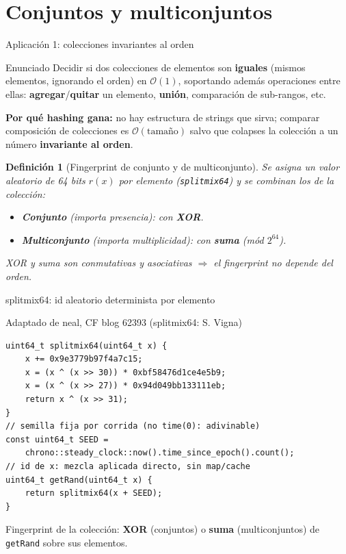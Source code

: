 \documentclass{beamer}
\newtheorem{definicion}{Definición}
\begin{document}
\section{Conjuntos y multiconjuntos}

\begin{frame}{Aplicación 1: colecciones invariantes al orden}
\begin{block}{Enunciado}
Decidir si dos colecciones de elementos son \textbf{iguales} (mismos elementos, ignorando el orden) en $\mathcal{O}(1)$, soportando además operaciones entre ellas: \textbf{agregar}/\textbf{quitar} un elemento, \textbf{unión}, comparación de sub-rangos, etc.
\end{block}
\pause
\textbf{Por qué hashing gana:} no hay estructura de strings que sirva; comparar composición de colecciones es $\mathcal{O}(\text{tamaño})$ salvo que colapses la colección a un número \textbf{invariante al orden}.
\pause
\begin{definicion}[Fingerprint de conjunto y de multiconjunto]
Se asigna un valor aleatorio de 64 bits $r(x)$ por elemento (\texttt{splitmix64}) y se combinan los de la colección:
\begin{itemize}
    \item \textbf{Conjunto} (importa presencia): con \textbf{XOR}.
    \item \textbf{Multiconjunto} (importa multiplicidad): con \textbf{suma} (mód $2^{64}$).
\end{itemize}
XOR y suma son conmutativas y asociativas $\Rightarrow$ el fingerprint no depende del orden.
\end{definicion}
\end{frame}

\begin{frame}[fragile]{splitmix64: id aleatorio determinista por elemento}
\begin{exampleblock}{Adaptado de neal, CF blog 62393 (splitmix64: S. Vigna)}
{\footnotesize
\begin{verbatim}
uint64_t splitmix64(uint64_t x) {
    x += 0x9e3779b97f4a7c15;
    x = (x ^ (x >> 30)) * 0xbf58476d1ce4e5b9;
    x = (x ^ (x >> 27)) * 0x94d049bb133111eb;
    return x ^ (x >> 31);
}
// semilla fija por corrida (no time(0): adivinable)
const uint64_t SEED =
    chrono::steady_clock::now().time_since_epoch().count();
// id de x: mezcla aplicada directo, sin map/cache
uint64_t getRand(uint64_t x) {
    return splitmix64(x + SEED);
}
\end{verbatim}
}
\end{exampleblock}
Fingerprint de la colección: \textbf{XOR} (conjuntos) o \textbf{suma} (multiconjuntos) de \texttt{getRand} sobre sus elementos.
\end{frame}
\end{document}
